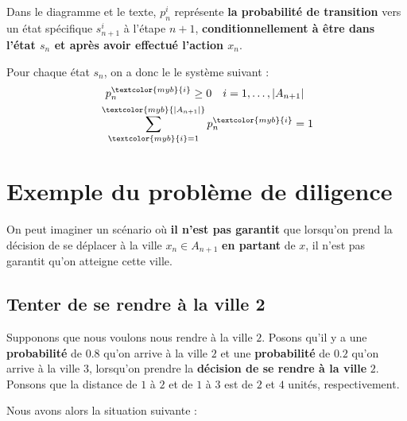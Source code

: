 \documentclass{report}
\begin{document}
\begin{multicols*}{2}
\begin{note}{}{}
   Dans le diagramme et le texte, \( p^i_n \) représente \textbf{la probabilité de transition} vers un état spécifique \( s_{n+1}^{i} \) à l’étape \( n+1 \), \textbf{conditionnellement à être dans l’état \( s_n \) et après avoir effectué l’action \( x_n \)}. 
\end{note}                                

    Pour chaque état $s_n$, on a donc le le système suivant : 
    \begin{align*}
            &\phantom{p}p_{n}^{\textcolor{myb}{i}} \geq 0 \quad i = 1, \dots, |A_{n+1}|  
            \\
            &\sum_{\textcolor{myb}{i} =1}^{\textcolor{myb}{|A_{n+1}|}}p_n^{\textcolor{myb}{i}} 
            = 1
    \end{align*}            

    \section{Exemple du problème de diligence}
    On peut imaginer un scénario où \textbf{il n'est pas garantit} que lorsqu'on 
    prend la décision de se déplacer à la ville $x_n \in A_{n+1}$ \textbf{en partant}  
    de $x$, il n'est pas garantit qu'on atteigne cette ville. 


\subsection{Tenter de se rendre à la ville $\boldsymbol{2}$}
    Supponons que nous voulons nous rendre à la ville $2$.
    Posons qu'il y a une \textbf{probabilité}  de $0.8$ qu'on arrive à la ville $2$ 
    et une \textbf{probabilité} de $0.2$ qu'on arrive à la ville $3$, lorsqu'on 
    prendre la \textbf{décision  de se rendre à la ville} $2$. Ponsons que la 
    distance de $1$ à $2$ et de $1$ à $3$ est de $2$ et $4$ unités, respectivement. 

    Nous avons alors la situation suivante :
    \begin{center}
        \begin{tikzpicture}[
        scale=0.85, 
            ->,>=stealth',shorten >=1pt, auto, 
            node distance=2cm and 2cm, thick,
            every node/.style={font=\sffamily},
            state/.style={circle, draw, minimum size=6mm, font=\footnotesize},
            weight/.style={font=\small},
            dottedarrow/.style={->, dotted, thick},
            arrow/.style={->, thick},
            costred/.style={text=red, font=\small},
            costmyb/.style={text=myb, font=\small},
            squarebox/.style={draw=green, thick, minimum size=6mm, font=\bfseries, align=center}
        ]


\end{tikzpicture}
\end{center}
\end{multicols*}
\end{document}
